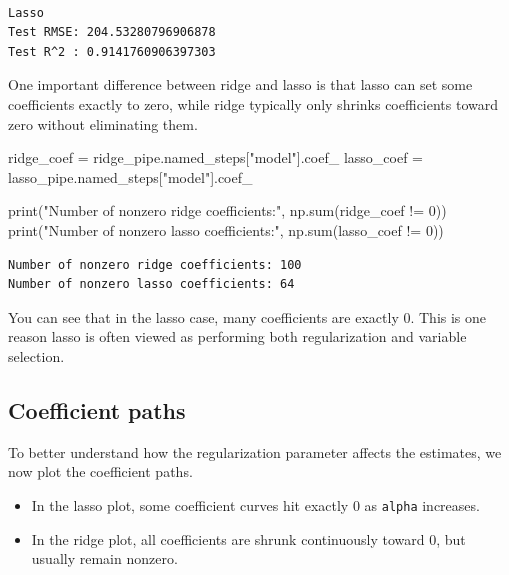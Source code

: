 \documentclass[
  letterpaper,
  DIV=11,
  numbers=noendperiod]{scrreprt}
\newenvironment{Shaded}{\begin{snugshade}}{\end{snugshade}}
\newcommand{\BuiltInTok}[1]{\textcolor[rgb]{0.00,0.23,0.31}{#1}}
\newcommand{\DecValTok}[1]{\textcolor[rgb]{0.68,0.00,0.00}{#1}}
\newcommand{\NormalTok}[1]{\textcolor[rgb]{0.00,0.23,0.31}{#1}}
\newcommand{\OperatorTok}[1]{\textcolor[rgb]{0.37,0.37,0.37}{#1}}
\newcommand{\StringTok}[1]{\textcolor[rgb]{0.13,0.47,0.30}{#1}}
\providecommand{\tightlist}{%
  \setlength{\itemsep}{0pt}\setlength{\parskip}{0pt}}
\theoremstyle{definition}
\theoremstyle{definition}
\theoremstyle{plain}
\theoremstyle{plain}
\theoremstyle{remark}
\begin{document}
\begin{verbatim}

Lasso
Test RMSE: 204.53280796906878
Test R^2 : 0.9141760906397303
\end{verbatim}

One important difference between ridge and lasso is that lasso can set
some coefficients exactly to zero, while ridge typically only shrinks
coefficients toward zero without eliminating them.

\begin{Shaded}
\begin{Highlighting}[]
\NormalTok{ridge\_coef }\OperatorTok{=}\NormalTok{ ridge\_pipe.named\_steps[}\StringTok{"model"}\NormalTok{].coef\_}
\NormalTok{lasso\_coef }\OperatorTok{=}\NormalTok{ lasso\_pipe.named\_steps[}\StringTok{"model"}\NormalTok{].coef\_}

\BuiltInTok{print}\NormalTok{(}\StringTok{"Number of nonzero ridge coefficients:"}\NormalTok{, np.}\BuiltInTok{sum}\NormalTok{(ridge\_coef }\OperatorTok{!=} \DecValTok{0}\NormalTok{))}
\BuiltInTok{print}\NormalTok{(}\StringTok{"Number of nonzero lasso coefficients:"}\NormalTok{, np.}\BuiltInTok{sum}\NormalTok{(lasso\_coef }\OperatorTok{!=} \DecValTok{0}\NormalTok{))}
\end{Highlighting}
\end{Shaded}

\begin{verbatim}
Number of nonzero ridge coefficients: 100
Number of nonzero lasso coefficients: 64
\end{verbatim}

You can see that in the lasso case, many coefficients are exactly \(0\).
This is one reason lasso is often viewed as performing both
regularization and variable selection.

\subsection{Coefficient paths}\label{coefficient-paths}

To better understand how the regularization parameter affects the
estimates, we now plot the coefficient paths.

\begin{itemize}
\tightlist
\item
  In the lasso plot, some coefficient curves hit exactly \(0\) as
  \texttt{alpha} increases.
\item
  In the ridge plot, all coefficients are shrunk continuously toward
  \(0\), but usually remain nonzero.
\end{itemize}
\end{document}

